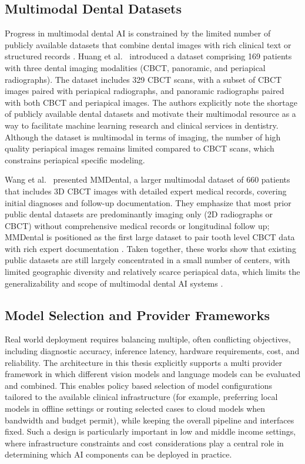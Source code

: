 \documentclass[12pt,a4paper]{report}
\begin{document}
	\subsection{Multimodal Dental Datasets}
	
	Progress in multimodal dental AI is constrained by the limited number of
	publicly available datasets that combine dental images with rich clinical text
	or structured records \cite{Huang2024MultimodalDentalDataset,Wang2025MMDentalDataset}.
	Huang et al.~\cite{Huang2024MultimodalDentalDataset} introduced a dataset
	comprising 169 patients with three dental imaging modalities (CBCT, panoramic,
	and periapical radiographs). The dataset includes 329 CBCT scans, with a subset
	of CBCT images paired with periapical radiographs, and panoramic radiographs
	paired with both CBCT and periapical images. The authors explicitly note the
	shortage of publicly available dental datasets and motivate their multimodal
	resource as a way to facilitate machine learning research and clinical services
	in dentistry. Although the dataset is multimodal in terms of imaging, the number
	of high quality periapical images remains limited compared to CBCT scans, which
	constrains periapical specific modeling.
	
	Wang et al.~\cite{Wang2025MMDentalDataset} presented MMDental, a larger
	multimodal dataset of 660 patients that includes 3D CBCT images with detailed
	expert medical records, covering initial diagnoses and follow-up documentation.
	They emphasize that most prior public dental datasets are predominantly
	imaging only (2D radiographs or CBCT) without comprehensive medical records or
	longitudinal follow up; MMDental is positioned as the first large dataset to
	pair tooth level CBCT data with rich expert documentation
	\cite{Wang2025MMDentalDataset}. Taken together, these works show that existing
	public datasets are still largely concentrated in a small number of centers,
	with limited geographic diversity and relatively scarce periapical data, which
	limits the generalizability and scope of multimodal dental AI systems
	\cite{Huang2024MultimodalDentalDataset,Wang2025MMDentalDataset}.
	
	\subsection{Model Selection and Provider Frameworks}
	
	Real world deployment requires balancing multiple, often conflicting objectives,
	including diagnostic accuracy, inference latency, hardware requirements, cost,
	and reliability. The architecture in this thesis explicitly supports a
	multi provider framework in which different vision models and language models
	can be evaluated and combined. This enables policy based selection of model
	configurations tailored to the available clinical infrastructure (for example,
	preferring local models in offline settings or routing selected cases to cloud
	models when bandwidth and budget permit), while keeping the overall pipeline and
	interfaces fixed. Such a design is particularly important in low and
	middle income settings, where infrastructure constraints and cost considerations
	play a central role in determining which AI components can be deployed in
	practice.
	
\end{document}
